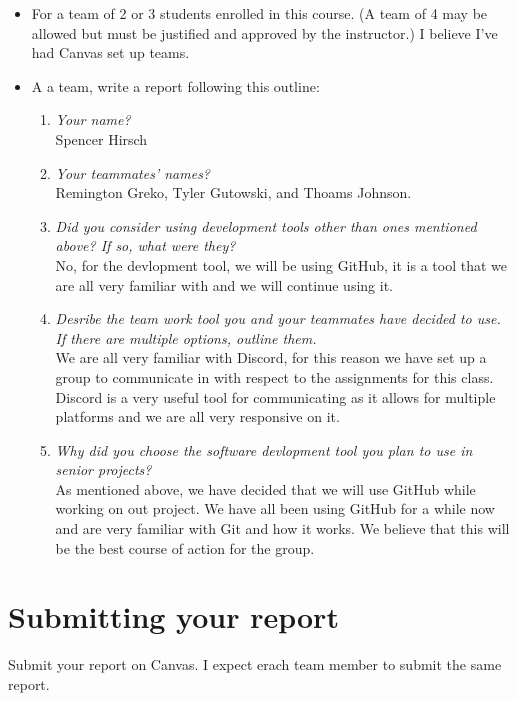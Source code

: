 \documentclass{article}
\begin{document}
\begin{itemize}
    \item For a team of 2 or 3 students enrolled in this course. (A team of 4 may be
    allowed but must be justified and approved by the instructor.) I believe I've
    had Canvas set up teams.
    \item A a team, write a report following this outline:
    \begin{enumerate}
        \item \textit{Your name?} \\ Spencer Hirsch
        
        \item \textit{Your teammates' names?} \\ Remington Greko, Tyler Gutowski, and Thoams Johnson.
        
        \item \textit{Did you consider using development tools other than ones mentioned above?
        If so, what were they?} \\ No, for the devlopment tool, we will be using GitHub, it
        is a tool that we are all very familiar with and we will continue using it.
        
        \item \textit{Desribe the team work tool you and your teammates have decided to use. If
        there are multiple options, outline them.} \\ We are all very familiar with Discord,
        for this reason we have set up a group to communicate in with respect to the
        assignments for this class. Discord is a very useful tool for communicating as
        it allows for multiple platforms and we are all very responsive on it.
        
        \item \textit{Why did you choose the software devlopment tool you plan to use in senior
        projects?} \\ As mentioned above, we have decided that we will use GitHub while working
        on out project. We have all been using GitHub for a while now and are very familiar with
        Git and how it works. We believe that this will be the best course of action for the
        group.
    \end{enumerate}
\end{itemize}

\section{\textbf{Submitting your report}}

Submit your report on Canvas. I expect erach team member to submit the same report.
\end{document}
